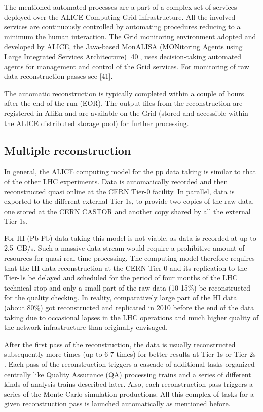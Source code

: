\documentclass{intech}
\begin{document}
The mentioned automated processes are a part of a complex set of
services deployed over the ALICE Computing Grid infrastructure. All
the involved services are continuously controlled by automating
procedures reducing to a minimum the human interaction. The Grid
monitoring environment adopted and developed by ALICE, the
Java-based MonALISA (MONitoring Agents using Large Integrated
Services Architecture) [40], uses decision-taking automated agents
for management and control of the Grid services. For monitoring of
raw data reconstruction passes see [41].

The automatic reconstruction is typically completed within a couple
of hours after the end of the run (EOR). The output files from the
reconstruction are registered in AliEn and are available on the Grid
(stored and accessible within the ALICE distributed storage pool)
for further processing.


\subsection{Multiple reconstruction}
%
In general, the ALICE computing model for the pp data taking is
similar to that of the other LHC experiments. Data is automatically
recorded and then reconstructed quasi online at the CERN Tier-0
facility. In parallel, data is exported to the different external
Tier-1s, to provide two copies of the raw data, one stored at the
CERN CASTOR and another copy shared by all the external Tier-1s.

For HI (Pb-Pb) data taking this model is not viable, as data is
recorded at up to 2.5~GB/s.  Such a massive data stream would
require a prohibitive amount of resources for quasi real-time
processing. The computing model therefore requires that the HI data
reconstruction at the CERN Tier-0 and its replication to the Tier-1s
be delayed and scheduled for the period of four months of the LHC
technical stop and only a small part of the raw data (10-15\%) be
reconstructed for the quality checking. In reality, comparatively
large part of the HI data (about 80\%) got reconstructed and
replicated in 2010 before the end of the data taking due to
occasional lapses in the LHC operations and much higher quality of
the network infrastructure than originally envisaged.

After the first pass of the reconstruction, the data is usually
reconstructed subsequently more times (up to 6-7 times) for better
results at Tier-1s or Tier-2s . Each pass of the reconstruction
triggers a cascade of additional tasks organized centrally like
Quality Assurance (QA) processing trains and a series of different
kinds of analysis trains described later. Also, each reconstruction
pass triggers a series of the Monte Carlo simulation productions.
All this complex of tasks for a given reconstruction pass is
launched automatically as mentioned before.
\end{document}
